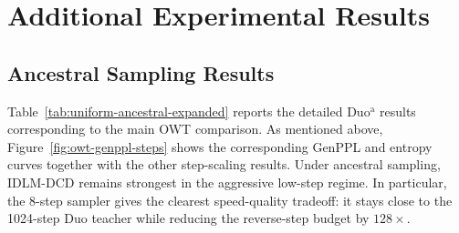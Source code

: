 \clearpage
\section{Additional Experimental Results}
\label{app:additional-experimental-results}

\subsection{Ancestral Sampling Results}
\label{app:ancestral-sampling-results}
Table~\ref{tab:uniform-ancestral-expanded} reports the detailed Duo$^{\mathrm{a}}$ results corresponding to the main OWT comparison. As mentioned above, Figure~\ref{fig:owt-genppl-steps} shows the corresponding GenPPL and entropy curves together with the other step-scaling results. Under ancestral sampling, IDLM-DCD remains strongest in the aggressive low-step regime. In particular, the 8-step sampler gives the clearest speed-quality tradeoff: it stays close to the 1024-step Duo teacher while reducing the reverse-step budget by $128\times$.

